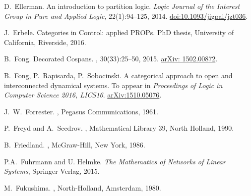 \begin{thebibliography}{RSW00}

  D.\ Ellerman.
  \newblock An introduction to partition logic.
  \newblock \textsl{Logic Journal of the Interest Group in Pure and Applied
  Logic}, { 22}(1):94--125, 2014.
  \newblock
  \href{http://doi.org/10.1093/jigpal/jzt036}{doi:10.1093/jigpal/jzt036}.
    
    J.\ Erbele.
    \newblock Categories in Control: applied PROPs.
    \newblock PhD thesis, University of California, Riverside, 2016. 

    B.\ Fong.
    \newblock Decorated Cospans.
    , 30(33):25--50, 2015.
    \newblock \href{http://arxiv.org/abs/1502.00872}{arXiv: 1502.00872}.

    B.\ Fong, P.\ Rapisarda, P.\ Sobocinski.
    \newblock A categorical approach to open and interconnected dynamical
    systems.
    \newblock To appear in {\sl Proceedings of Logic in Computer Science 2016,
    LICS16}.
    \newblock \href{http://arxiv.org/abs/1510.05076}{arXiv:1510.05076}.

    J.\ W.\ Forrester.
    , Pegasus Communications, 1961. 
    
    P.\ Freyd and A.\ Scedrov.
    , Mathematical Library 39, North
    Holland, 1990.

    B.\ Friedland. 
    , McGraw-Hill, New York, 1986.

    P.A.~Fuhrmann and U. Helmke.
    \newblock \emph{The Mathematics of Networks of Linear Systems},
    Springer-Verlag, 2015. 

    M.\ Fukushima.
    ,
    North-Holland, Amsterdam, 1980.


\end{thebibliography}
